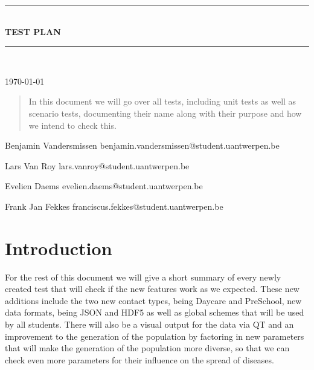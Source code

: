 \documentclass{article}
\newcommand{\HRule}[1]{\rule{\linewidth}{#1}}
\begin{document}
\begin{titlepage}
	\begin{center}
		\HRule{0.5pt} \\
		\LARGE \textbf{\uppercase{Test plan}}
		\HRule{2pt} \\ [0.5cm]
		{\normalsize \today \par}
		\vspace{2cm}
		\begin{abstract}
			\noindent
			In this document we will go over all tests, including unit tests as well as scenario tests, documenting their name along with their purpose and how we intend to check this.
			
		\end{abstract}
		\vfill
		\vfill
		{\normalsize Benjamin Vandersmissen \scriptsize benjamin.vandersmissen@student.uantwerpen.be \par}
		{\normalsize Lars Van Roy \scriptsize lars.vanroy@student.uantwerpen.be \par}
		{\normalsize Evelien Daems \scriptsize evelien.daems@student.uantwerpen.be \par}
		{\normalsize Frank Jan Fekkes \scriptsize franciscus.fekkes@student.uantwerpen.be \par}
	\end{center}
	
	\vfill
	
	\date{}
	
	\author{}
\end{titlepage}

\newpage

\tableofcontents

\newpage

\section{Introduction}
For the rest of this document we will give a short summary of every newly created test that will check if the new features work as we expected. These new additions include the two new contact types, being Daycare and PreSchool, new data formats, being JSON and HDF5 as well as global schemes that will be used by all students. There will also be a visual output for the data via QT and an improvement to the generation of the population by factoring in new parameters that will make the generation of the population more diverse, so that we can check even more parameters for their influence on the spread of diseases.
\end{document}
